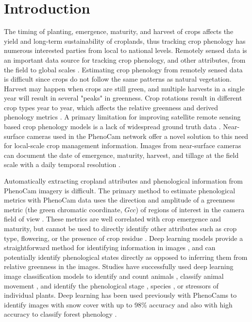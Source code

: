 \documentclass[remotesensing,article,submit,moreauthors,pdftex]{Definitions/mdpi}
\begin{document}

\section{Introduction}
The timing of planting, emergence, maturity, and harvest of crops affects the yield and long-term sustainability of croplands, thus tracking crop phenology has numerous interested parties from local to national levels. Remotely sensed data is an important data source for tracking crop phenology, and other attributes, from the field to global scales \citep{weiss2020}. Estimating crop phenology from remotely sensed data is difficult since crops do not follow the same patterns as natural vegetation. Harvest may happen when crops are still green, and multiple harvests in a single year will result in several "peaks" in greenness. Crop rotations result in different crop types year to year, which affects the relative greenness and derived phenology metrics \citep{gao2017}. A primary limitation for improving satellite remote sensing based crop phenology models is a lack of widespread ground truth data \citep{gao-zhang2021}. Near-surface cameras used in the PhenoCam network offer a novel solution to this need for local-scale crop management information. Images from near-surface cameras can document the date of emergence, maturity, harvest, and tillage at the field scale with a daily temporal resolution \citep{hufkens2019}.

Automatically extracting cropland attributes and phenological information from PhenoCam imagery is difficult. The primary method to estimate phenological metrics with PhenoCam data uses the direction and amplitude of a greenness metric (the green chromatic coordinate, $Gcc$) of regions of interest in the camera field of view \citep{richardson2018a, seyednasrollah2019b-scidata}. These metrics are well correlated with crop emergence and maturity, but cannot be used to directly identify other attributes such as crop type, flowering, or the presence of crop residue \citep{browning2021}. Deep learning models provide a straightforward method for identifying information in images \citep{borowiec2021}, and can potentially identify phenological states directly as opposed to inferring them from relative greenness in the  images. Studies have successfully used deep learning image classification models to identify and count animals \citep{weinstein2018, norouzzadeh2018}, classify animal movement \citep{conway2021}, and identify the phenological stage \citep{correia2020, kim2021}, species \citep{jones2020}, or stressors \citep{ghosal2018} of individual plants. Deep learning has been used previously with PhenoCams to identify images with snow cover with up to 98\% accuracy \citep{kosmala2016} and also with high accuracy to classify forest phenology \citep{song2021, cao2021}.
\end{document}
